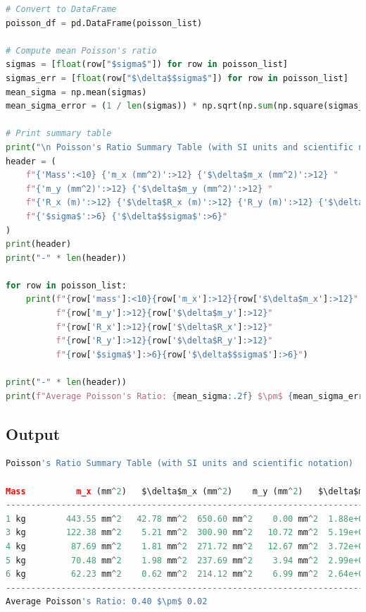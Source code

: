\documentclass[a4paper,11pt]{article}
\begin{document}
\begin{lstlisting}[language=Python]
# Convert to DataFrame
poisson_df = pd.DataFrame(poisson_list)

# Compute mean Poisson's ratio
sigmas = [float(row["$sigma$"]) for row in poisson_list]
sigmas_err = [float(row["$\delta$$sigma$"]) for row in poisson_list]
mean_sigma = np.mean(sigmas)
mean_sigma_error = (1 / len(sigmas)) * np.sqrt(np.sum(np.square(sigmas_err)))

# Print summary table
print("\n Poisson's Ratio Summary Table (with SI units and scientific notation)\n")
header = (
    f"{'Mass':<10} {'m_x (mm^2)':>12} {'$\delta$m_x (mm^2)':>12} "
    f"{'m_y (mm^2)':>12} {'$\delta$m_y (mm^2)':>12} "
    f"{'R_x (m)':>12} {'$\delta$R_x (m)':>12} {'R_y (m)':>12} {'$\delta$R_y (m)':>12} "
    f"{'$sigma$':>6} {'$\delta$$sigma$':>6}"
)
print(header)
print("-" * len(header))

for row in poisson_list:
    print(f"{row['mass']:<10}{row['m_x']:>12}{row['$\delta$m_x']:>12}"
          f"{row['m_y']:>12}{row['$\delta$m_y']:>12}"
          f"{row['R_x']:>12}{row['$\delta$R_x']:>12}"
          f"{row['R_y']:>12}{row['$\delta$R_y']:>12}"
          f"{row['$sigma$']:>6}{row['$\delta$$sigma$']:>6}")

print("-" * len(header))
print(f"Average Poisson's Ratio: {mean_sigma:.2f} $\pm$ {mean_sigma_error:.2f}")

\end{lstlisting}
\label{Code: 4}

\begin{landscape}
  \pagestyle{empty}  %
\subsection{Output}
\begin{lstlisting}[language=Python]
Poisson's Ratio Summary Table (with SI units and scientific notation)

Mass          m_x (mm^2)   $\delta$m_x (mm^2)    m_y (mm^2)   $\delta$m_y (mm^2)      R_x (m)     $\delta$R_x (m)      R_y (m)     $\delta$R_y (m)      $sigma$     $\delta$$sigma$
---------------------------------------------------------------------------------------------------------------------------
1 kg        443.55 mm^2   42.78 mm^2  650.60 mm^2    0.00 mm^2  1.88e+02 m  1.81e+01 m  2.76e+02 m  0.00e+00 m  0.68  0.07
3 kg        122.38 mm^2    5.21 mm^2  300.90 mm^2   10.72 mm^2  5.19e+01 m  2.21e+00 m  1.28e+02 m  4.55e+00 m  0.41  0.02
4 kg         87.69 mm^2    1.81 mm^2  271.72 mm^2   12.67 mm^2  3.72e+01 m  7.68e-01 m  1.15e+02 m  5.38e+00 m  0.32  0.02
5 kg         70.48 mm^2    1.98 mm^2  237.69 mm^2    3.94 mm^2  2.99e+01 m  8.40e-01 m  1.01e+02 m  1.67e+00 m  0.30  0.01
6 kg         62.23 mm^2    0.62 mm^2  214.12 mm^2    6.99 mm^2  2.64e+01 m  2.65e-01 m  9.08e+01 m  2.97e+00 m  0.29  0.01
---------------------------------------------------------------------------------------------------------------------------
Average Poisson's Ratio: 0.40 $\pm$ 0.02
\end{lstlisting}
\label{output: 2}

\end{landscape}
\end{document}
